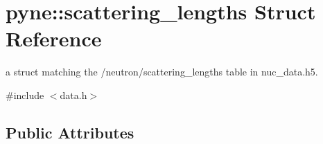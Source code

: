 \hypertarget{structpyne_1_1scattering__lengths}{}\section{pyne\+:\+:scattering\+\_\+lengths Struct Reference}
\label{structpyne_1_1scattering__lengths}


a struct matching the \textquotesingle{}/neutron/scattering\+\_\+lengths\textquotesingle{} table in nuc\+\_\+data.\+h5.  




{\ttfamily \#include $<$data.\+h$>$}

\subsection*{Public Attributes}
